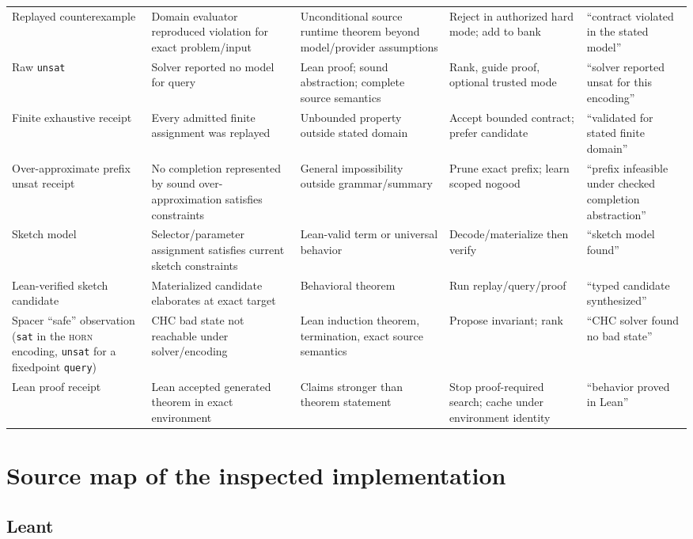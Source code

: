 \documentclass[11pt,oneside]{report}
\newcommand{\code}[1]{\texttt{#1}}
\begin{document}
\begin{landscape}
\begin{longtable}{@{}L{0.19\textwidth}L{0.18\textwidth}L{0.18\textwidth}L{0.18\textwidth}L{0.20\textwidth}@{}}
Replayed counterexample & Domain evaluator reproduced violation for exact problem/input & Unconditional source runtime theorem beyond model/provider assumptions & Reject in authorized hard mode; add to bank & ``contract violated in the stated model'' \\
Raw \texttt{unsat} & Solver reported no model for query & Lean proof; sound abstraction; complete source semantics & Rank, guide proof, optional trusted mode & ``solver reported unsat for this encoding'' \\
Finite exhaustive receipt & Every admitted finite assignment was replayed & Unbounded property outside stated domain & Accept bounded contract; prefer candidate & ``validated for stated finite domain'' \\
Over-approximate prefix unsat receipt & No completion represented by sound over-approximation satisfies constraints & General impossibility outside grammar/summary & Prune exact prefix; learn scoped nogood & ``prefix infeasible under checked completion abstraction'' \\
Sketch model & Selector/parameter assignment satisfies current sketch constraints & Lean-valid term or universal behavior & Decode/materialize then verify & ``sketch model found'' \\
Lean-verified sketch candidate & Materialized candidate elaborates at exact target & Behavioral theorem & Run replay/query/proof & ``typed candidate synthesized'' \\
Spacer ``safe'' observation (\texttt{sat} in the \textsc{horn} encoding, \texttt{unsat} for a fixedpoint \code{query}) & CHC bad state not reachable under solver/encoding & Lean induction theorem, termination, exact source semantics & Propose invariant; rank & ``CHC solver found no bad state'' \\
Lean proof receipt & Lean accepted generated theorem in exact environment & Claims stronger than theorem statement & Stop proof-required search; cache under environment identity & ``behavior proved in Lean'' \\
\end{longtable}
\end{landscape}

\chapter{Source map of the inspected implementation}
\label{app:source-map}

\section{Leant}
\end{document}
